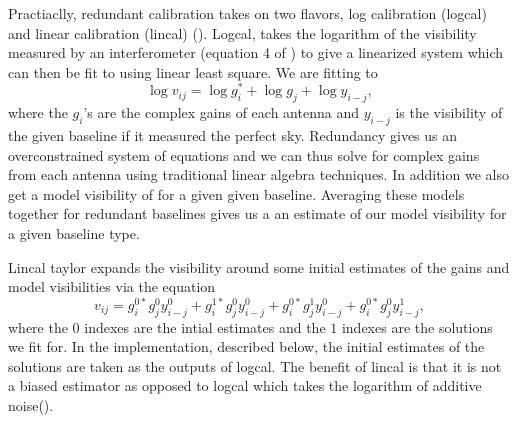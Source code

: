 \documentclass[twocolumn,numberedappendix]{emulateapj} \shorttitle{PSA64}
\begin{document}
Practiaclly, redundant calibration takes on two flavors, log calibration (logcal) and
linear calibration (lincal) (\cite{liu_et_al2010,zheng_et_al2014}). Logcal, takes
the logarithm of the visibility measured by an interferometer (equation 4 of
\cite{zheng_et_al2014}) to give a linearized system which can then be fit to
using linear least square. We are fitting to
\begin{equation}\label{eqn:logcal}
    \log{v_{ij}} = \log{g_{i}^{*}} + \log{g_{j}} + \log{y_{i-j}},
\end{equation}
where the $g_{i}$'s are the
complex gains of each antenna and $y_{i-j}$ is the visibility of the given
baseline if it measured the perfect sky. Redundancy gives us an overconstrained
system of equations and we can thus solve for complex gains from each antenna
using traditional linear algebra techniques.  In addition we also get a model
visibility of for a given given baseline.  Averaging these models together for
redundant baselines gives us a an estimate of our model visibility for a given
baseline type.

Lincal taylor expands the visibility around some initial estimates of the gains
and model visibilities via the equation 
\begin{equation}\label{eqn:lincal}
v_{ij} = g_{i}^{0*}g_{j}^{0}y_{i-j}^{0} + g_{i}^{1*}g_{j}^{0}y_{i-j}^{0} +
         g_{i}^{0*}g_{j}^{1}y_{i-j}^{0}+g_{i}^{0*}g_{j}^{0}y_{i-j}^{1},
\end{equation}
where the $0$ indexes are the intial estimates and the $1$ indexes are the
solutions we fit for. In the implementation, described below, the initial
estimates of the solutions are taken as the outputs of logcal. The benefit of
lincal is that it is not a biased estimator as opposed to logcal which takes the
logarithm of additive noise(\cite{liu_et_al2010}).
\end{document}
